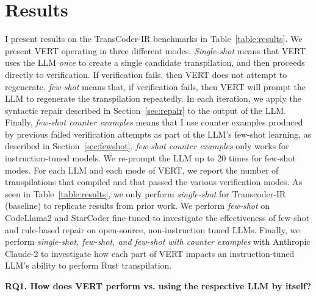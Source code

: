 \documentclass[12pt,openany,oneside,table]{cmuthesis}
\begin{document}
\section{Results}
I present results on the TransCoder-IR benchmarks in Table~\ref{table:results}. We present VERT{} operating in three different modes. \textit{Single-shot} means that VERT{} uses the LLM \textit{once} to create a single candidate transpilation, and then proceeds directly to verification. If verification fails, then VERT{} does not attempt to regenerate. 
\textit{few-shot} means that, if verification fails, then VERT{} will prompt the LLM to regenerate the transpilation repeatedly. In each iteration, we apply the syntactic repair described in Section~\ref{sec:repair} to the output of the LLM. Finally, \textit{few-shot counter examples} means that I use counter examples produced by previous failed verification attempts as part of the LLM's few-shot learning, as described in Section~\ref{sec:fewshot}. \textit{few-shot counter examples} only works for instruction-tuned models. We re-prompt the LLM up to 20 times for few-shot modes. For each LLM and each mode of VERT{}, we report the number of transpilations that compiled and that passed the various verification modes. As seen in Table~\ref{table:results}, we only perform \textit{single-shot} for Transcoder-IR (baseline) to replicate results from prior work. We perform \textit{few-shot} on CodeLlama2 and StarCoder fine-tuned to investigate the effectiveness of few-shot and rule-based repair on open-source, non-instruction tuned LLMs. Finally, we perform \textit{single-shot, few-shot, and few-shot with counter examples} with Anthropic Claude-2 to investigate how each part of VERT impacts an instruction-tuned LLM's ability to perform Rust transpilation.

\label{section:results}

\noindent\textbf{RQ1. How does VERT perform vs. using the respective LLM by itself?}
\end{document}
